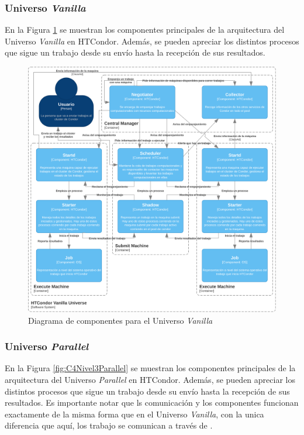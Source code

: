 \subsubsection{Universo \textit{Vanilla}}
\noindent
En la Figura \ref{fig:C4Nivel3Vanilla} se muestran los componentes principales de la arquitectura del Universo \textit{Vanilla} en HTCondor. Además, se pueden apreciar los distintos procesos que sigue un trabajo desde su envío hasta la recepción de sus resultados.

\begin{figure}[H]
	\centering
	\includegraphics[scale=0.09]{tablas-images/C4/Diagramas HTCondor-Nivel 3 - Vanilla.drawio.png}
	\caption{Diagrama de componentes para el Universo \textit{Vanilla}}
    \label{fig:C4Nivel3Vanilla}
\end{figure}

\subsubsection{Universo \textit{Parallel}}
\noindent
En la Figura \ref{fig:C4Nivel3Parallel} se muestran los componentes principales de la arquitectura del Universo \textit{Parallel} en HTCondor. Además, se pueden apreciar los distintos procesos que sigue un trabajo desde su envío hasta la recepción de sus resultados. Es importante notar que ls comunicación y los componentes funcionan exactamente de la misma forma que en el Universo \textit{Vanilla}, con la unica diferencia que aquí, los trabajo se comunican a través de \MPI.

